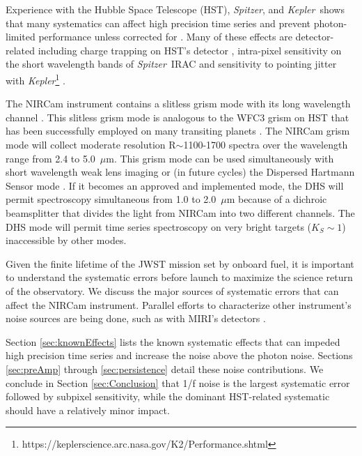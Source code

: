 \documentclass{aastex62}
\newcommand{\spitzer}{{\it Spitzer}}
\newcommand{\kepler}{{\it Kepler}}
\begin{document}
Experience with the Hubble Space Telescope (HST), \spitzer, and \kepler\ shows that many systematics can affect high precision time series and prevent photon-limited performance unless corrected for \citep[e.g.][]{beichman2014pasp}.
Many of these effects are detector-related including charge trapping on HST's detector \citep{berta2012flat_gj1214,zhou2017chargeTrap}, intra-pixel sensitivity on the short wavelength bands of \spitzer\ IRAC \citep{moralesCalderon2006LdwarfsWeatherIPC} and sensitivity to pointing jitter with \kepler\footnote{https://keplerscience.arc.nasa.gov/K2/Performance.shtml} \citep[e.g.][]{vanderburg2014twoWheeledKeplerPhot,beichman2014pasp}.

The NIRCam instrument \citep{rieke2005nircamSPIE} contains a slitless grism mode with its long wavelength channel \citep{greene2017jatisNIRCam}.
This slitless grism mode is analogous to the WFC3 grism on HST that has been successfully employed on many transiting planets \citep[e.g.][]{deming13,kreidberg2014wasp43,sing2016continuum,wakeford2017hatp26}.
The NIRCam grism mode will collect moderate resolution R$\sim$1100-1700 spectra over the wavelength range from 2.4 to 5.0~$\mu$m.
This grism mode can be used simultaneously with short wavelength weak lens imaging or (in future cycles) the Dispersed Hartmann Sensor mode \citep{schlawin2017dhs}. If it becomes an approved and implemented mode, the DHS will permit spectroscopy simultaneous from 1.0 to 2.0~$\mu$m because of a dichroic beamsplitter that divides the light from NIRCam into two different channels.
The DHS mode will permit time series spectroscopy on very bright targets ($K_S \sim 1$) inaccessible by other modes.

Given the finite lifetime of the JWST mission set by onboard fuel, it is important to understand the systematic errors before launch to maximize the science return of the observatory.
We discuss the major sources of systematic errors that can affect the NIRCam instrument.
Parallel efforts to characterize other instrument's noise sources are being done, such as with MIRI's detectors \citep{matuso2019siAsDetectorStability}.

Section \ref{sec:knownEffects} lists the known systematic effects that can impeded high precision time series and increase the noise above the photon noise.
Sections \ref{sec:preAmp} through \ref{sec:persistence} detail these noise contributions.
We conclude in Section \ref{sec:Conclusion} that 1/f noise is the largest systematic error followed by subpixel sensitivity, while the dominant HST-related systematic should have a relatively minor impact.
\end{document}
